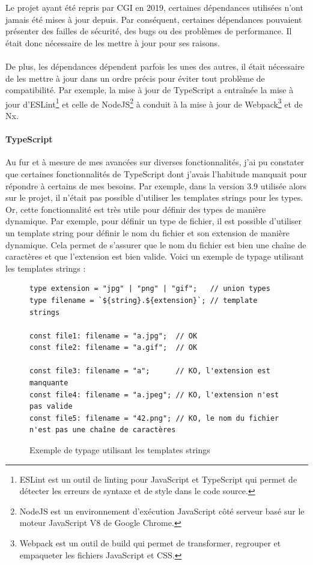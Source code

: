 \documentclass[12pt, a4paper]{report}
\begin{document}
	Le projet ayant été repris par CGI en 2019, certaines dépendances utilisées n'ont jamais été mises à jour depuis. Par conséquent, certaines dépendances pouvaient présenter des failles de sécurité, des bugs ou des problèmes de performance. Il était donc nécessaire de les mettre à jour pour ses raisons.
	\\\\
	De plus, les dépendances dépendent parfois les unes des autres, il était nécessaire de les mettre à jour dans un ordre précis pour éviter tout problème de compatibilité. Par exemple, la mise à jour de TypeScript a entraînée la mise à jour d'ESLint\footnote{ESLint est un outil de linting pour JavaScript et TypeScript qui permet de détecter les erreurs de syntaxe et de style dans le code source.} et celle de NodeJS\footnote{NodeJS est un environnement d'exécution JavaScript côté serveur basé sur le moteur JavaScript V8 de Google Chrome.} à conduit à la mise à jour de Webpack\footnote{Webpack est un outil de build qui permet de transformer, regrouper et empaqueter les fichiers JavaScript et CSS.} et de Nx.

	\paragraph{TypeScript}

	Au fur et à mesure de mes avancées sur diverses fonctionnalités, j'ai pu constater que certaines fonctionnalités de TypeScript dont j'avais l'habitude manquait pour répondre à certains de mes besoins. Par exemple, dans la version 3.9 utilisée alors sur le projet, il n'était pas possible d'utiliser les \flqq{} templates strings \frqq{} pour les types. Or, cette fonctionnalité est très utile pour définir des types de manière dynamique. Par exemple, pour définir un type de fichier, il est possible d'utiliser un \flqq{} template string \frqq{} pour définir le nom du fichier et son extension de manière dynamique. Cela permet de s'assurer que le nom du fichier est bien une chaîne de caractères et que l'extension est bien valide. Voici un exemple de typage utilisant les \flqq{} templates strings \frqq{} :
	
	\begin{figure}[!h]
	\begin{verbatim}
type extension = "jpg" | "png" | "gif";   // union types
type filename = `${string}.${extension}`; // template strings

const file1: filename = "a.jpg";  // OK
const file2: filename = "a.gif";  // OK

const file3: filename = "a";      // KO, l'extension est manquante
const file4: filename = "a.jpeg"; // KO, l'extension n'est pas valide
const file5: filename = "42.png"; // KO, le nom du fichier n'est pas une chaîne de caractères
	\end{verbatim}
	\vspace{-.8cm}
	\caption{Exemple de typage utilisant les \flqq{} templates strings \frqq{}}
	\end{figure}
\end{document}
